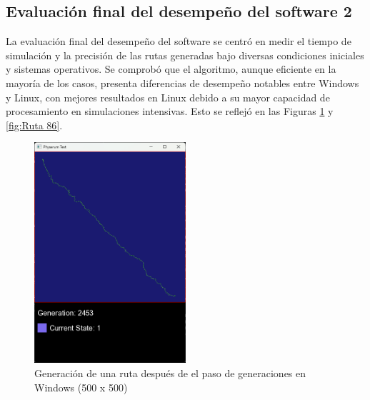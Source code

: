 \subsection{Evaluaci\'on final del desempe\~no del software 2}
    La evaluaci\'on final del desempe\~no del software se centr\'o en
        medir el tiempo de simulaci\'on y la precisi\'on de las rutas
        generadas bajo diversas condiciones iniciales y sistemas
        operativos. Se comprob\'o que el algoritmo, aunque eficiente
        en la mayor\'ia de los casos, presenta diferencias de
        desempe\~no notables entre Windows y Linux, con mejores
        resultados en Linux debido a su mayor capacidad de
        procesamiento en simulaciones intensivas. Esto se reflej\'o en
        las Figuras \ref{fig:Ruta 85} y \ref{fig:Ruta 86}.
    \vskip 0.5cm
    \begin{figure}[htbp]
        \centering
        \includegraphics[width=0.5\textwidth]{./images/Pruebas/simulador/image085.png}
        \caption{Generaci\'on de una ruta despu\'es de el paso de generaciones en Windows (500 x 500)}
        \label{fig:Ruta 85}
    \end{figure}
    \vskip 0.5cm
